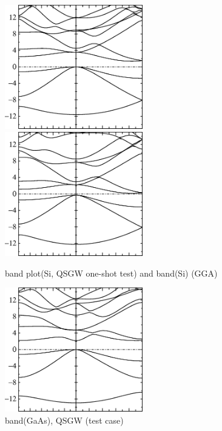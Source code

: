 \begin{figure}[h]
 \begin{center}
  \includegraphics[width=60mm]{img/bandoneshotsi.eps}
  \includegraphics[width=60mm]{img/bandggasi.eps}
  \caption{band plot(Si, QSGW one-shot test)    and    band(Si) (GGA)}
 \end{center}
\end{figure}



\begin{figure}[hbtp]
  \includegraphics[width=60mm]{img/bandqsgwgaas.eps}
  \caption{band(GaAs), QSGW (test case)}
\end{figure}

